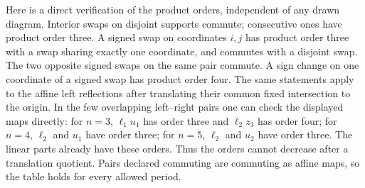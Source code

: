 \documentclass[11pt,a4paper]{article}
\begin{document}
Here is a direct verification of the product orders, independent of
any drawn diagram. Interior swaps on disjoint supports commute;
consecutive ones have product order three. A signed swap on
coordinates $i,j$ has product order three with a swap sharing
exactly one coordinate, and commutes with a disjoint swap. The
two opposite signed swaps on the same pair commute. A sign change
on one coordinate of a signed swap has product order four.
The same statements apply to the affine left reflections after
translating their common fixed intersection to the origin. In the
few overlapping left--right pairs one can check the displayed
maps directly: for $n=3$, $\ell_1u_1$ has order three and
$\ell_2z_3$ has order four;
for $n=4$, $\ell_2$ and $u_1$ have order three; for $n=5$,
$\ell_2$ and $u_2$ have order three. The linear parts already
have these orders. Thus the orders cannot decrease after a
translation quotient. Pairs declared commuting are commuting
as affine maps, so the table holds for every allowed period.
\end{document}
